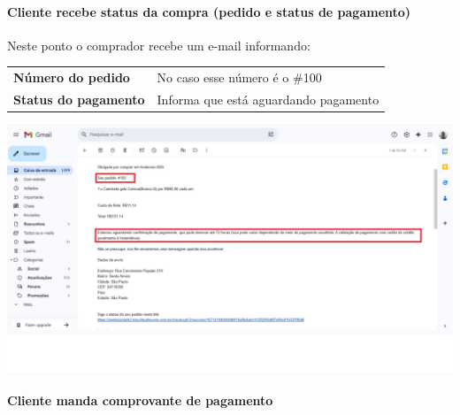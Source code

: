 \documentclass[
]{book}
\begin{document}
\paragraph{Cliente recebe status da compra (pedido e status de pagamento)}\label{cliente-recebe-status-da-compra-pedido-e-status-de-pagamento}

Neste ponto o comprador recebe um e-mail informando:

\begin{longtable}[]{@{}ll@{}}
\toprule\noalign{}
\endhead
\bottomrule\noalign{}
\endlastfoot
\textbf{Número do pedido} & No caso esse número é o \#100 \\
\textbf{Status do pagamento} & Informa que está aguardando pagamento \\
\end{longtable}

\includegraphics{images/np1/103-loja_virtual_cliente_email_confirmacao.jpg}

\paragraph{Cliente manda comprovante de pagamento}\label{cliente-manda-comprovante-de-pagamento}
\end{document}
